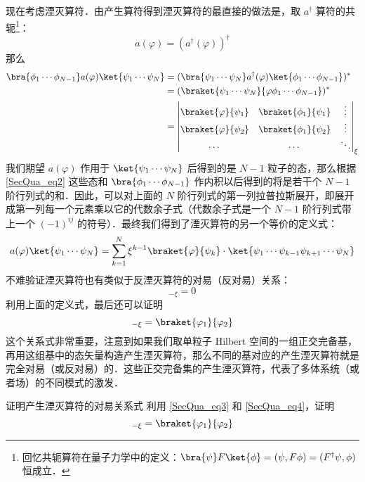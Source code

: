 现在考虑湮灭算符．由产生算符得到湮灭算符的最直接的做法是，取 $a^\dagger$ 算符的共轭\footnote{回忆共轭算符在量子力学中的定义：$\bra{\psi}F\ket{\phi}=(\psi,F \phi)=(F^\dagger \psi,\phi)$ 恒成立．}：
\begin{equation}
a(\varphi)=(a^\dagger(\varphi))^\dagger
\end{equation}
那么
\begin{equation}\label{SecQua_eq4}
\begin{aligned}
\bra{\phi_1\cdots\phi_{N-1}} a(\varphi) \ket{\psi_1\cdots\psi_{N}}&=(\bra{\psi_1\cdots\psi_{N}}a^\dagger(\varphi)\ket{\phi_1\cdots\phi_{N-1}})^*\\
&=(\braket{\psi_1\cdots\psi_{N}}{\varphi\phi_1\cdots\phi_{N-1}})^*\\
&=\left|
\begin{matrix}
\braket{\varphi}{\psi_1} & \braket{\phi_1}{\psi_1} & \vdots\\
\braket{\varphi}{\psi_2} & \braket{\phi_1}{\psi_2} & \vdots\\
\cdots & \cdots & \ddots
\end{matrix}
\right|_{\xi}
\end{aligned}
\end{equation}
我们期望 $a(\varphi)$ 作用于 $\ket{\psi_1\cdots\psi_N}$ 后得到的是 $N-1$ 粒子的态，那么根据\autoref{SecQua_eq2} 这些态和 $\bra{\phi_1\cdots\phi_{N-1}}$ 作内积以后得到的将是若干个 $N-1$ 阶行列式的和．因此，可以对上面的 $N$ 阶行列式的第一列拉普拉斯展开，即展开成第一列每一个元素乘以它的代数余子式（代数余子式是一个 $N-1$ 阶行列式带上一个 $(-1)^{ij}$ 的符号）．最终我们得到了湮灭算符的另一个等价的定义式：
\begin{equation}\label{SecQua_eq5}
a(\varphi)\ket{\psi_1\cdots\psi_N}=\sum_{k=1}^N \xi^{k-1} \braket{\varphi}{\psi_k} \cdot\ket{\psi_1\cdots\psi_{k-1}\psi_{k+1}\cdots \psi_N}
\end{equation}
不难验证湮灭算符也有类似于反湮灭算符的对易（反对易）关系：
\begin{equation}
[a(\varphi_1),a(\varphi_2)]_{-\xi}=0
\end{equation}
利用上面的定义式，最后还可以证明
\begin{equation}
[a(\varphi_1),a^\dagger(\varphi_2)]_{-\xi}=\braket{\varphi_1}{\varphi_2}
\end{equation}
这个关系式非常重要，注意到如果我们取单粒子 Hilbert 空间的一组正交完备基，再用这组基中的态矢量构造产生湮灭算符，那么不同的基对应的产生湮灭算符就是完全对易（或反对易）的．这些正交完备集的产生湮灭算符，代表了多体系统（或者场）的不同模式的激发．
\begin{exercise}{证明产生湮灭算符的对易关系式}
利用 \autoref{SecQua_eq3} 和 \autoref{SecQua_eq4}，证明
\begin{equation}
[a(\varphi_1),a^\dagger(\varphi_2)]_{-\xi}=\braket{\varphi_1}{\varphi_2}
\end{equation}
\end{exercise}

